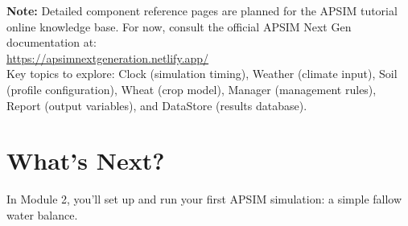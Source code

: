 \begin{tipbox}
\textbf{Note:} Detailed component reference pages are planned for the APSIM tutorial online knowledge base. For now, consult the official APSIM Next Gen documentation at:\\[0.3em]
\url{https://apsimnextgeneration.netlify.app/} \\[0.3em]
Key topics to explore: Clock (simulation timing), Weather (climate input), Soil (profile configuration), Wheat (crop model), Manager (management rules), Report (output variables), and DataStore (results database).
\end{tipbox}

\section{What's Next?}

In Module 2, you'll set up and run your first APSIM simulation: a simple fallow water balance.

